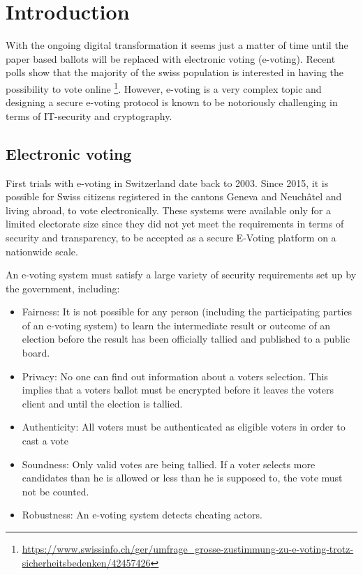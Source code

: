 \chapter{Introduction}
With the ongoing digital transformation it seems just a matter of time until the paper based ballots will be replaced with electronic voting (e-voting). Recent polls show that the majority of the swiss population is interested in having the possibility to vote online \footnote{\url{https://www.swissinfo.ch/ger/umfrage_grosse-zustimmung-zu-e-voting-trotz-sicherheitsbedenken/42457426}}. However, e-voting is a very complex topic and designing a secure e-voting protocol is known to be notoriously challenging in terms of IT-security and cryptography. 

\section{Electronic voting}
First trials with e-voting in Switzerland date back to 2003. Since 2015, it is possible for Swiss citizens registered in the cantons Geneva and Neuchâtel and living abroad, to vote electronically. These systems were available only for a limited electorate size since they did not yet meet the requirements in terms of security and transparency, to be accepted as a secure E-Voting platform on a nationwide scale.

An e-voting system must satisfy a large variety of security requirements set up by the government, including:

\begin{itemize}
	\item Fairness: It is not possible for any person (including the participating parties of an e-voting system) to learn the intermediate result or outcome of an election before the result has been officially tallied and published to a public board.  
	\item Privacy: No one can find out information about a voters selection. This implies that a voters ballot must be encrypted before it leaves the voters client and until the election is tallied.
	\item Authenticity: All voters must be authenticated as eligible voters in order to cast a vote
	\item Soundness: Only valid votes are being tallied. If a voter selects more candidates than he is allowed or less than he is supposed to, the vote must not be counted.
 \item Robustness: An e-voting system detects cheating actors.
\end{itemize}

